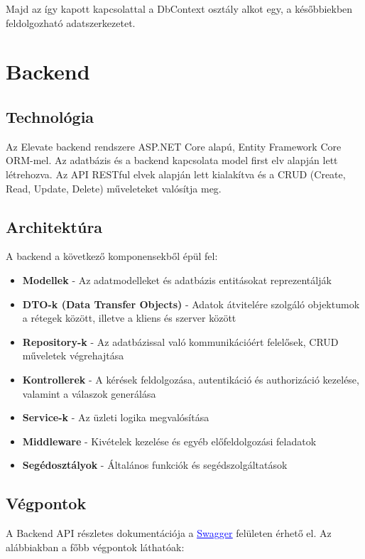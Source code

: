 \documentclass[12pt]{report}
\begin{document}
Majd az így kapott kapcsolattal a DbContext osztály alkot egy, a későbbiekben feldolgozható adatszerkezetet.

\chapter{Backend}

\section{Technológia}
Az Elevate backend rendszere ASP.NET Core alapú, Entity Framework Core ORM-mel. Az adatbázis és a backend kapcsolata model first elv alapján lett létrehozva. Az API RESTful elvek alapján lett kialakítva és a CRUD (Create, Read, Update, Delete) műveleteket valósítja meg.

\section{Architektúra}
A backend a következő komponensekből épül fel:
\begin{itemize}
  \item \textbf{Modellek} - Az adatmodelleket és adatbázis entitásokat reprezentálják
  \item \textbf{DTO-k (Data Transfer Objects)} - Adatok átvitelére szolgáló objektumok a rétegek között, illetve a kliens és szerver között
  \item \textbf{Repository-k} - Az adatbázissal való kommunikációért felelősek, CRUD műveletek végrehajtása
  \item \textbf{Kontrollerek} - A kérések feldolgozása, autentikáció és authorizáció kezelése, valamint a válaszok generálása
  \item \textbf{Service-k} - Az üzleti logika megvalósítása
  \item \textbf{Middleware} - Kivételek kezelése és egyéb előfeldolgozási feladatok
  \item \textbf{Segédosztályok} - Általános funkciók és segédszolgáltatások
\end{itemize}

\section{Végpontok}
A Backend API részletes dokumentációja a \href{https://elevate.koyeb.app/swagger}{\textcolor{blue}{\underline{Swagger}}} felületen érhető el. Az alábbiakban a főbb végpontok láthatóak:
\end{document}
